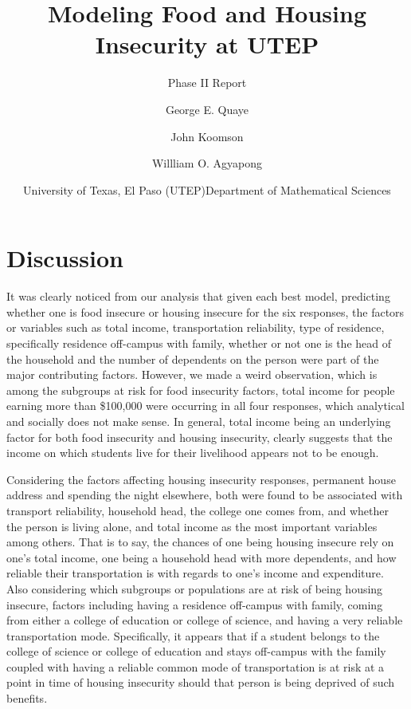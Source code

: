 \documentclass[
  10pt,
]{article}
\title{Modeling Food and Housing Insecurity at UTEP}
\subtitle{Phase II Report}
\author{George E. Quaye \and John Koomson \and Willliam O. Agyapong}
\date{\center University of Texas, El Paso (UTEP)\center \center Department of Mathematical Sciences \center}
\begin{document}
\maketitle

{
\hypersetup{linkcolor=}
\setcounter{tocdepth}{4}
\tableofcontents
}
\hypertarget{discussion}{%
\section{Discussion}\label{discussion}}

It was clearly noticed from our analysis that given each best model, predicting whether one is food insecure or housing insecure for the six responses, the factors or variables such as total income, transportation reliability, type of residence, specifically residence off-campus with family, whether or not one is the head of the household and the number of dependents on the person were part of the major contributing factors. However, we made a weird observation, which is among the subgroups at risk for food insecurity factors, total income for people earning more than \$100,000 were occurring in all four responses, which analytical and socially does not make sense. In general, total income being an underlying factor for both food insecurity and housing insecurity, clearly suggests that the income on which students live for their livelihood appears not to be enough.

Considering the factors affecting housing insecurity responses, permanent house address and spending the night elsewhere, both were found to be associated with transport reliability, household head, the college one comes from, and whether the person is living alone, and total income as the most important variables among others. That is to say, the chances of one being housing insecure rely on one's total income, one being a household head with more dependents, and how reliable their transportation is with regards to one's income and expenditure. Also considering which subgroups or populations are at risk of being housing insecure, factors including having a residence off-campus with family, coming from either a college of education or college of science, and having a very reliable transportation mode. Specifically, it appears that if a student belongs to the college of science or college of education and stays off-campus with the family coupled with having a reliable common mode of transportation is at risk at a point in time of housing insecurity should that person is being deprived of such benefits.
\end{document}
